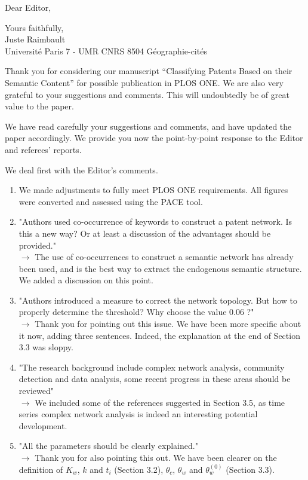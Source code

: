 \documentclass[11pt,a4paper,sans]{moderncv}        %
\begin{document}
\date{\today}
\opening{Dear Editor,}
\closing{Yours faithfully,\\
Juste Raimbault\\
Université Paris 7 - UMR CNRS 8504 Géographie-cités
}
\makelettertitle

\justify
\justify
Thank you for considering our manuscript ``Classifying Patents Based
on their Semantic Content'' for possible publication in PLOS ONE. We are also very grateful to your suggestions and comments. This will undoubtedly be of great value to the paper.

We have read carefully your suggestions and comments, and have updated the paper accordingly. We provide you now the point-by-point response to the Editor and referees' reports.

We deal first with the Editor's comments. 
\begin{enumerate}
    \item We made adjustments to fully meet PLOS ONE requirements. All figures were converted and assessed using the PACE tool.
    \item "Authors used co-occurrence of keywords to construct a patent network. Is this a new way? Or at least a discussion of the advantages should be provided." \\
    $\rightarrow$ The use of co-occurrences to construct a semantic network has already been used, and is the best way to extract the endogenous semantic structure. We added a discussion on this point.
    \item "Authors introduced a measure to correct the network topology. But how to properly determine the threshold? Why choose the value 0.06 ?"\\
    $\rightarrow$ Thank you for pointing out this issue. We have been more specific about it now, adding three sentences. Indeed, the explanation at the end of Section 3.3 was sloppy.
    
    \item "The research background include complex network analysis, community detection and data analysis, some recent progress in these areas should be reviewed" \\
    $\rightarrow$ We included some of the references suggested in Section 3.5, as time series complex network analysis is indeed an interesting potential development.
    \item "All the parameters should be clearly explained."\\
    $\rightarrow$ Thank you for also pointing this out. We have been clearer on the definition of $K_w$, $k$ and $t_i$ (Section 3.2), $\theta_c$, $\theta_w$ and $\theta_w^{(0)}$ (Section 3.3).
\end{enumerate}
\end{document}
